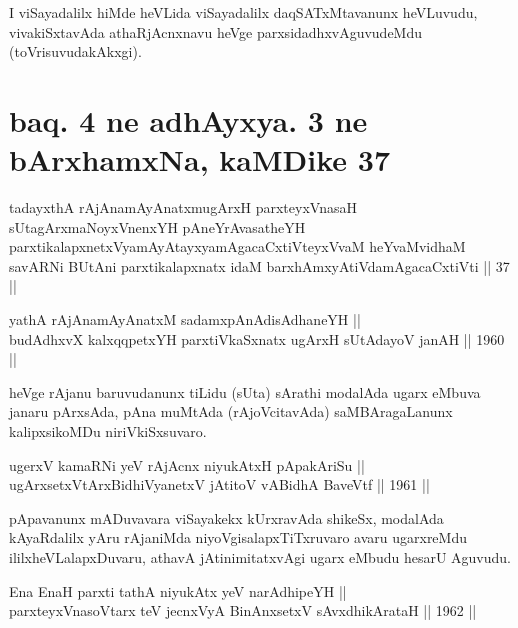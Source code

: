 \begin{artha}
I viSayadalilx hiMde heVLida viSayadalilx daqSATxMtavanunx
heVLuvudu, vivakiSxtavAda athaRjAcnxnavu heVge parxsidadhxvAguvudeMdu
(toVrisuvudakAkxgi).
\end{artha}

\section*{baq. 4 ne adhAyxya. 3 ne bArxhamxNa, kaMDike 37}

\begin{shl}
tadayxthA rAjAnamAyAnatxmugArxH parxteyxVnasaH sUtagArxmaNoyxV\s nenxYH pAneYrAvasatheYH parxtikalapxnetxV\s yamAyAtayxyamAgacaCxtiVteyxVvaM heYvaMvidhaM savARNi BUtAni parxtikalapxnatx idaM barxhAmxyAtiVdamAgacaCxtiVti || 37 ||
\end{shl}


\begin{shl}
yathA rAjAnamAyAnatxM sadamxpAnAdisAdhaneYH || \\
budAdhxvX kalxqqpetxYH parxtiVkaSxnatx ugArxH sUtAdayoV janAH \hfill || 1960 ||
  
\end{shl}

\begin{artha}
heVge rAjanu baruvudanunx tiLidu (sUta) sArathi modalAda ugarx eMbuva
janaru pArxsAda, pAna muMtAda (rAjoVcitavAda) saMBAragaLanunx
kalipxsikoMDu niriVkiSxsuvaro.
\end{artha}


\begin{shl}
ugerxV kamaRNi yeV rAjAcnx niyukAtxH pApakAriSu || \\
ugArxsetxV\s tArxBidhiVyanetxV \footnotemark[1]jAtitoV vA\s BidhA BaveVtf \hfill || 1961 ||
  
\end{shl}

\begin{artha}
pApavanunx mADuvavara viSayakekx kUrxravAda shikeSx, modalAda
kAyaRdalilx yAru rAjaniMda niyoVgisalapxTiTxruvaro avaru ugarxreMdu
ililxheVLalapxDuvaru, athavA jAtinimitatxvAgi ugarx eMbudu hesarU Aguvudu.
\end{artha}


\begin{shl}
Ena EnaH parxti tathA niyukAtx yeV narAdhipeYH || \\
parxteyxVnasoV\s tarx teV jecnxVyA BinAnxsetxV sAvxdhikArataH \hfill || 1962 ||
  
\end{shl}

